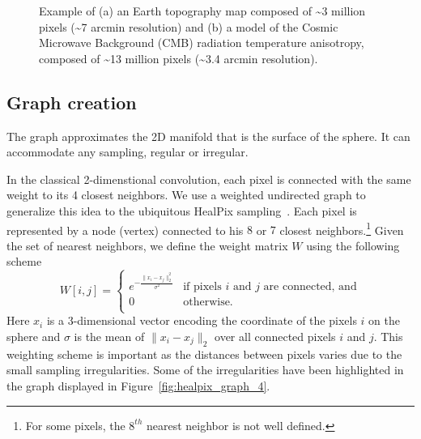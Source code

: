 \documentclass[final,twocolumn,3p,times,authoryear]{elsarticle}
\newcommand{\nati}[1]{{\color[rgb]{.1,.6,.1}{#1}}}
\newcommand{\todo}[1]{{\color[rgb]{.6,.1,.6}{#1}}}
\newcommand{\figref}[1]{Figure~\ref{fig:#1}}
\newcommand{\1}{\b{1}}              %
\newcommand{\0}{\b{0}}              %
\begin{document}
\begin{figure}[ht]
\begin{subfigure}[b]{0.45\linewidth}
		\caption{}
		\label{fig:example_cmb}
	\end{subfigure}
	\caption[]{Example of (a) an Earth topography map composed of \textasciitilde 3 million pixels (\textasciitilde 7 arcmin resolution) and (b) a model of the Cosmic Microwave Background (CMB) radiation temperature anisotropy, composed of \textasciitilde 13 million pixels (\textasciitilde 3.4 arcmin resolution).\footnotemark}
	\label{fig:example_maps}
\end{figure}


\subsection{Graph creation}

The graph approximates the 2D manifold that is the surface of the sphere. It can accommodate any sampling, regular or irregular.

In the classical 2-dimenstional convolution, each pixel is connected with the
same weight to its 4 closest neighbors. We use a weighted undirected graph to
generalize this idea to the ubiquitous HealPix
sampling~\citep{gorski2005healpix}.  Each pixel is represented by a node
(vertex) connected to his $8$ or $7$ closest neighbors.\footnote{For some
pixels, the $8^{th}$ nearest neighbor is not well defined.} Given the set of
nearest neighbors, we define the weight matrix $W$ using the following scheme
\begin{equation}
W[i,j]=\begin{cases}
e^{-\frac{\|x_i-x_j\|_2^2}{\sigma^2}} & \text{if pixels $i$ and $j$ are connected, and}\\
0 & \text{otherwise.}\\
\end{cases}
\end{equation}
\todo{why not $1/d$? See Pascal's paper, \nati{ The question is: is $1/d$ also good when we have 7/8 neighboors instead of 4? Practically, we can also use $1/d$, but that means changing the code and re-runing the experiment. We probably do not have to change any parameter though... @mdeff: do you think we should try this for this paper? Or we keep that for the next one.}}
Here $x_i$ is a 3-dimensional vector encoding the coordinate of the pixels $i$
on the sphere and $\sigma$ is the mean of $\|x_i-x_j\|_2$ over all connected
pixels $i$ and $j$. This weighting scheme is important as the distances between
pixels varies due to the small sampling irregularities. Some of the
irregularities have been highlighted in the graph displayed in
\figref{healpix_graph_4}.
\end{document}

